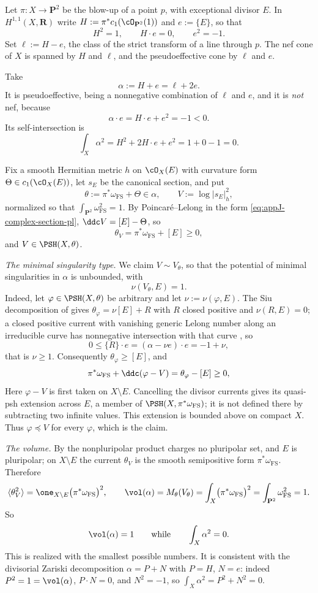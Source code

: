 \begin{example}
\label{ex:ch51-blowup-mass}
Let $\pi:X\to\mathbf P^2$ be the blow-up of a point $p$, with
exceptional divisor $E$.  In $H^{1,1}(X,\mathbf R)$ write
$H:=\pi^*c_1(\cO_{\mathbf P^2}(1))$ and $e:=\{E\}$, so that
\[
 H^2=1,\qquad H\cdot e=0,\qquad e^2=-1 .
\]
Set $\ell:=H-e$, the class of the strict transform of a line through
$p$.  The nef cone of $X$ is spanned by $H$ and $\ell$, and the
pseudoeffective cone by $\ell$ and $e$.

Take
\[
 \alpha:=H+e=\ell+2e .
\]
It is pseudoeffective, being a nonnegative combination of $\ell$ and
$e$, and it is \emph{not} nef, because
\[
 \alpha\cdot e=H\cdot e+e^2=-1<0 .
\]
Its self-intersection is
\[
 \int_X\alpha^2=H^2+2H\cdot e+e^2=1+0-1=0 .
\]

Fix a smooth Hermitian metric $h$ on $\cO_X(E)$ with curvature form
$\Theta\in c_1(\cO_X(E))$, let $s_E$ be the canonical section, and
put
\[
 \theta:=\pi^*\omega_{\mathrm{FS}}+\Theta\in\alpha,
 \qquad
 V:=\log|s_E|^2_h ,
\]
normalized so that $\int_{\mathbf P^2}\omega_{\mathrm{FS}}^2=1$.  By
Poincar\'e--Lelong in the form \eqref{eq:appJ-complex-section-pl},
$\ddc V=[E]-\Theta$, so
\[
 \theta_V=\pi^*\omega_{\mathrm{FS}}+[E]\geq0,
\]
and $V\in\PSH(X,\theta)$.

\emph{The minimal singularity type.}  We claim
$V\sim V_\theta$, so that the potential of minimal singularities in
$\alpha$ is unbounded, with
\[
 \nu(V_\theta,E)=1 .
\]
Indeed, let $\varphi\in\PSH(X,\theta)$ be arbitrary and let
$\nu:=\nu(\varphi,E)$.  The Siu decomposition of
 gives $\theta_\varphi=\nu[E]+R$ with $R$
closed positive and $\nu(R,E)=0$; a closed positive current with
vanishing generic Lelong number along an irreducible curve has
nonnegative intersection with that curve \cite{Bou04}, so
\[
 0\leq\{R\}\cdot e=(\alpha-\nu e)\cdot e=-1+\nu ,
\]
that is $\nu\geq1$.  Consequently $\theta_\varphi\geq[E]$, and
\[
 \pi^*\omega_{\mathrm{FS}}+\ddc(\varphi-V)
 =\theta_\varphi-[E]\geq0 ,
\]
Here $\varphi-V$ is first taken on $X\setminus E$.  Cancelling
the divisor currents gives its quasi-psh extension across $E$, a member
of $\PSH(X,\pi^*\omega_{\mathrm{FS}})$; it is not defined there by
subtracting two infinite values.  This extension is bounded above on
compact $X$.  Thus
$\varphi\preceq V$ for every $\varphi$, which is the claim.

\emph{The volume.}  By  the nonpluripolar
product charges no pluripolar set, and $E$ is pluripolar; on
$X\setminus E$ the current $\theta_V$ is the smooth semipositive form
$\pi^*\omega_{\mathrm{FS}}$.  Therefore
\[
 \langle\theta_V^2\rangle
 =\one_{X\setminus E}\bigl(\pi^*\omega_{\mathrm{FS}}\bigr)^2,
 \qquad
 \vol(\alpha)=M_\theta(V_\theta)
 =\int_X\bigl(\pi^*\omega_{\mathrm{FS}}\bigr)^2
 =\int_{\mathbf P^2}\omega_{\mathrm{FS}}^2=1 .
\]
So
\[
 \vol(\alpha)=1
 \qquad\text{while}\qquad
 \int_X\alpha^2=0 .
\]
This is  realized with the
smallest possible numbers.  It is consistent with the divisorial Zariski
decomposition $\alpha=P+N$ with $P=H$, $N=e$: indeed
$P^2=1=\vol(\alpha)$, $P\cdot N=0$, and $N^2=-1$, so
$\int_X\alpha^2=P^2+N^2=0$.


\end{example}
